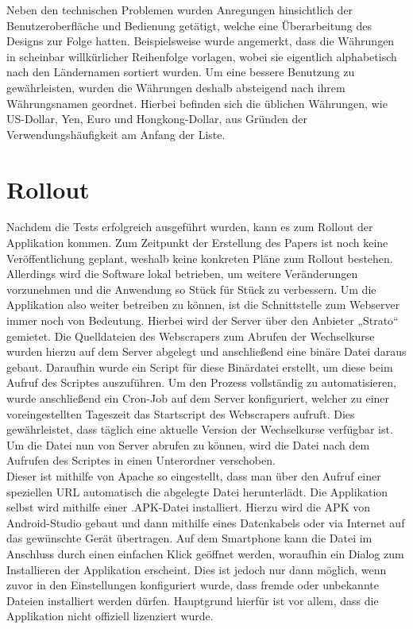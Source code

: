 \documentclass[conference]{IEEEtran}
\begin{document}
Neben den technischen Problemen wurden Anregungen hinsichtlich der Benutzeroberfläche und Bedienung getätigt, welche eine Überarbeitung des Designs zur Folge hatten. Beispielsweise wurde angemerkt, dass die Währungen in scheinbar willkürlicher Reihenfolge vorlagen, wobei sie eigentlich alphabetisch nach den Ländernamen sortiert wurden. Um eine bessere Benutzung zu gewährleisten, wurden die Währungen deshalb absteigend nach ihrem Währungsnamen geordnet. Hierbei befinden sich die üblichen Währungen, wie US-Dollar, Yen, Euro und Hongkong-Dollar, aus Gründen der Verwendungshäufigkeit am Anfang der Liste. 

\section{Rollout}
Nachdem die Tests erfolgreich ausgeführt wurden, kann es zum Rollout der Applikation kommen. Zum Zeitpunkt der Erstellung des Papers ist noch keine Veröffentlichung geplant, weshalb keine konkreten Pläne zum Rollout bestehen. \\
Allerdings wird die Software lokal betrieben, um weitere Veränderungen vorzunehmen und die Anwendung so Stück für Stück zu verbessern. Um die Applikation also weiter betreiben zu können, ist die Schnittstelle zum Webserver immer noch von Bedeutung. Hierbei wird der Server über den Anbieter „Strato“ gemietet. Die Quelldateien des Webscrapers zum Abrufen der Wechselkurse wurden hierzu auf dem Server abgelegt und anschließend eine binäre Datei daraus gebaut. Daraufhin wurde ein Script für diese Binärdatei erstellt, um diese beim Aufruf des Scriptes auszuführen. Um den Prozess vollständig zu automatisieren, wurde anschließend ein Cron-Job auf dem Server konfiguriert, welcher zu einer voreingestellten Tageszeit das Startscript des Webscrapers aufruft. Dies gewährleistet, dass täglich eine aktuelle Version der Wechselkurse verfügbar ist. Um die Datei nun von Server abrufen zu können, wird die Datei nach dem Aufrufen des Scriptes in einen Unterordner verschoben. \\
Dieser ist mithilfe von Apache so eingestellt, dass man über den Aufruf einer speziellen URL automatisch die abgelegte Datei herunterlädt. Die Applikation selbst wird mithilfe einer .APK-Datei installiert. Hierzu wird die APK von Android-Studio gebaut und dann mithilfe eines Datenkabels oder via Internet auf das gewünschte Gerät übertragen. Auf dem Smartphone kann die Datei im Anschluss durch einen einfachen Klick
geöffnet werden, woraufhin ein Dialog zum Installieren der Applikation erscheint. Dies ist jedoch nur dann möglich, wenn zuvor in den Einstellungen konfiguriert wurde, dass fremde oder unbekannte Dateien installiert werden dürfen. Hauptgrund hierfür ist vor allem, dass die Applikation nicht offiziell lizenziert wurde. \\
\end{document}
